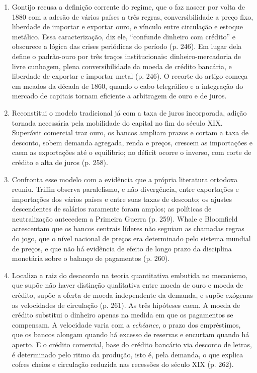 \begin{enumerate}[leftmargin=*,nosep]
\item Gontijo recusa a definição corrente do regime, que o faz nascer por volta
de 1880 com a adesão de vários países a três regras, conversibilidade a preço
fixo, liberdade de importar e exportar ouro, e vínculo entre circulação e estoque
metálico. Essa caracterização, diz ele, ``confunde dinheiro com crédito'' e
obscurece a lógica das crises periódicas do período (p. 246). Em lugar dela
define o padrão-ouro por três traços institucionais: dinheiro-mercadoria de livre
cunhagem, plena conversibilidade da moeda de crédito bancária, e liberdade de
exportar e importar metal (p. 246). O recorte do artigo começa em meados da
década de 1860, quando o cabo telegráfico e a integração do mercado de capitais
tornam eficiente a arbitragem de ouro e de juros.

\item Reconstitui o modelo tradicional já com a taxa de juros incorporada, adição
tornada necessária pela mobilidade do capital no fim do século XIX. Superávit
comercial traz ouro, os bancos ampliam prazos e cortam a taxa de desconto, sobem
demanda agregada, renda e preços, crescem as importações e caem as exportações
até o equilíbrio; no déficit ocorre o inverso, com corte de crédito e alta de
juros (p. 258).

\item Confronta esse modelo com a evidência que a própria literatura ortodoxa
reuniu. Triffin observa paralelismo, e não divergência, entre exportações e
importações dos vários países e entre suas taxas de desconto; os ajustes
descendentes de salários raramente foram amplos; as políticas de neutralização
antecedem a Primeira Guerra (p. 259). Whale e Bloomfield acrescentam que os
bancos centrais líderes não seguiam as chamadas regras do jogo, que o nível
nacional de preços era determinado pelo sistema mundial de preços, e que não há
evidência de efeito de longo prazo da disciplina monetária sobre o balanço de
pagamentos (p. 260).

\item Localiza a raiz do desacordo na teoria quantitativa embutida no mecanismo,
que supõe não haver distinção qualitativa entre moeda de ouro e moeda de crédito,
supõe a oferta de moeda independente da demanda, e supõe exógenas as velocidades
de circulação (p. 261). As três hipóteses caem. A moeda de crédito substitui o
dinheiro apenas na medida em que os pagamentos se compensam. A velocidade varia
com a \emph{echéance}, o prazo dos empréstimos, que os bancos alongam quando há
excesso de reservas e encurtam quando há aperto. E o crédito comercial, base do
crédito bancário via desconto de letras, é determinado pelo ritmo da produção,
isto é, pela demanda, o que explica cofres cheios e circulação reduzida nas
recessões do século XIX (p. 262).


\end{enumerate}
